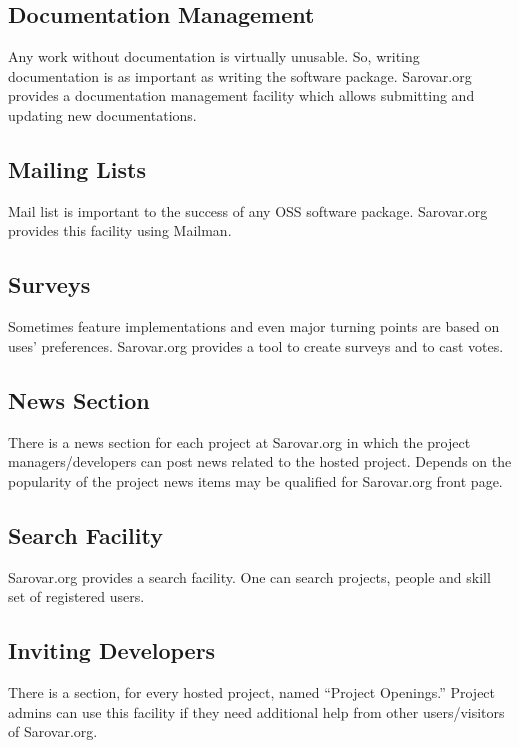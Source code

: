 \documentclass{article}
\begin{document}
\subsection{Documentation Management}

Any work without documentation is virtually unusable. So, writing
documentation is as important as writing the software package.
Sarovar.org provides a documentation management facility which allows
submitting and updating new documentations.

\subsection{Mailing Lists}

Mail list is important to the success of any OSS software package.
Sarovar.org provides this facility using Mailman.

\subsection{Surveys}

Sometimes feature implementations and even major turning points are
based on uses' preferences. Sarovar.org provides a tool to create
surveys and to cast votes.

\subsection{News Section}

There is a news section for each project at Sarovar.org in which the
project managers/developers can post news related to the hosted
project. Depends on the popularity of the project news items may be
qualified for Sarovar.org front page.

\subsection{Search Facility}

Sarovar.org provides a search facility. One can search projects,
people and skill set of registered users.

\subsection{Inviting Developers}

There is a section, for every hosted project, named ``Project
Openings.'' Project admins can use this facility if they need
additional help from other users/visitors of Sarovar.org.
\end{document}
